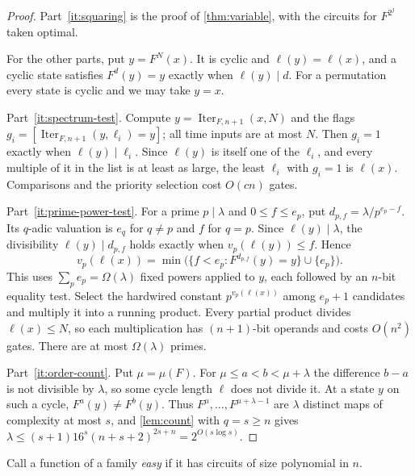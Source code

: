 \documentclass[11pt]{article}
\theoremstyle{definition}
\theoremstyle{remark}
\newcommand{\Iter}{\operatorname{Iter}}
\numberwithin{equation}{section}
\begin{document}
\begin{proof}
Part~\ref{it:squaring} is the proof of \cref{thm:variable}, with the
circuits for $F^{2^j}$ taken optimal.

For the other parts, put $y=F^N(x)$.  It is cyclic and $\ell(y)=\ell(x)$,
and a cyclic state satisfies $F^d(y)=y$ exactly when $\ell(y)\mid d$.  For
a permutation every state is cyclic and we may take $y=x$.

Part~\ref{it:spectrum-test}.  Compute $y=\Iter_{F,n+1}(x,N)$ and the flags
$g_i=[\Iter_{F,n+1}(y,\ell_i)=y]$; all time inputs are at most $N$.  Then
$g_i=1$ exactly when $\ell(y)\mid\ell_i$.  Since $\ell(y)$ is itself one of
the $\ell_i$, and every multiple of it in the list is at least as large,
the least $\ell_i$ with $g_i=1$ is $\ell(x)$.  Comparisons and the
priority selection cost $O(cn)$ gates.

Part~\ref{it:prime-power-test}.  For a prime $p\mid\lambda$ and
$0\leq f\leq e_p$, put $d_{p,f}=\lambda/p^{e_p-f}$.  Its $q$-adic
valuation is $e_q$ for $q\neq p$ and $f$ for $q=p$.  Since
$\ell(y)\mid\lambda$, the divisibility $\ell(y)\mid d_{p,f}$ holds exactly
when $v_p(\ell(y))\leq f$.  Hence
\[
 v_p(\ell(x))=\min\bigl(\{f<e_p:F^{d_{p,f}}(y)=y\}\cup\{e_p\}\bigr).
\]
This uses $\sum_pe_p=\Omega(\lambda)$ fixed powers applied to $y$, each
followed by an $n$-bit equality test.  Select the hardwired constant
$p^{v_p(\ell(x))}$ among $e_p+1$ candidates and multiply it into a running
product.  Every partial product divides $\ell(x)\leq N$, so each
multiplication has $(n+1)$-bit operands and costs $O(n^2)$ gates.  There
are at most $\Omega(\lambda)$ primes.

Part~\ref{it:order-count}.  Put $\mu=\mu(F)$.  For $\mu\leq a<b<\mu+\lambda$
the difference $b-a$ is not divisible by $\lambda$, so some cycle length
$\ell$ does not divide it.  At a state $y$ on such a cycle,
$F^a(y)\neq F^b(y)$.  Thus $F^\mu,\ldots,F^{\mu+\lambda-1}$ are $\lambda$
distinct maps of complexity at most $s$, and \cref{lem:count} with $q=s\geq n$
gives $\lambda\leq(s+1)16^s(n+s+2)^{2s+n}=2^{O(s\log s)}$.
\end{proof}

Call a function of a family \emph{easy} if it has circuits of size
polynomial in $n$.
\end{document}
